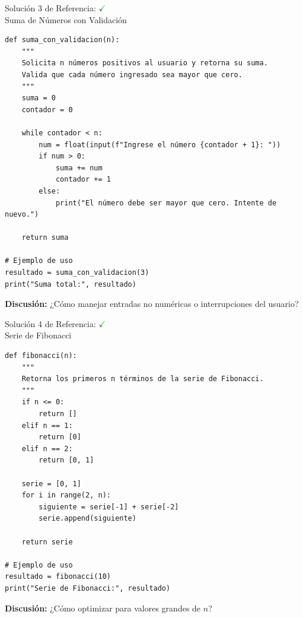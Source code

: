 \documentclass[10pt]{beamer}
\begin{document}
\begin{solutionblock}
\begin{frame}[fragile]{Solución 3 de Referencia: \hfill \textcolor{green}{$\checkmark$} \\ 
Suma de Números con Validación}
\begin{verbatim}
def suma_con_validacion(n):
    """
    Solicita n números positivos al usuario y retorna su suma.
    Valida que cada número ingresado sea mayor que cero.
    """
    suma = 0
    contador = 0

    while contador < n:
        num = float(input(f"Ingrese el número {contador + 1}: "))
        if num > 0:
            suma += num
            contador += 1
        else:
            print("El número debe ser mayor que cero. Intente de nuevo.")

    return suma

# Ejemplo de uso
resultado = suma_con_validacion(3)
print("Suma total:", resultado)
\end{verbatim}
\textbf{Discusión:} ¿Cómo manejar entradas no numéricas o interrupciones del usuario?
\end{frame}

\begin{frame}[fragile]{Solución 4 de Referencia: \hfill \textcolor{green}{$\checkmark$} \\ 
Serie de Fibonacci}
\begin{verbatim}
def fibonacci(n):
    """
    Retorna los primeros n términos de la serie de Fibonacci.
    """
    if n <= 0:
        return []
    elif n == 1:
        return [0]
    elif n == 2:
        return [0, 1]

    serie = [0, 1]
    for i in range(2, n):
        siguiente = serie[-1] + serie[-2]
        serie.append(siguiente)

    return serie

# Ejemplo de uso
resultado = fibonacci(10)
print("Serie de Fibonacci:", resultado)
\end{verbatim}
\textbf{Discusión:} ¿Cómo optimizar para valores grandes de \( n \)?
\end{frame}


\end{solutionblock}
\end{document}
